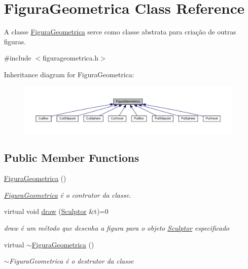 \hypertarget{class_figura_geometrica}{}\section{Figura\+Geometrica Class Reference}
\label{class_figura_geometrica}


A classe \hyperlink{class_figura_geometrica}{Figura\+Geometrica} serce como classe abstrata para criação de outras figuras.  




{\ttfamily \#include $<$figurageometrica.\+h$>$}



Inheritance diagram for Figura\+Geometrica\+:
\nopagebreak
\begin{figure}[H]
\begin{center}
\leavevmode
\includegraphics[width=350pt]{class_figura_geometrica__inherit__graph}
\end{center}
\end{figure}
\subsection*{Public Member Functions}
\begin{DoxyCompactItemize}
\item 
\hyperlink{class_figura_geometrica_a81d7c7efaea511e60a15f5a363138dd9}{Figura\+Geometrica} ()
\begin{DoxyCompactList}\small\item\em \hyperlink{class_figura_geometrica}{Figura\+Geometrica} é o contrutor da classe. \end{DoxyCompactList}\item 
virtual void \hyperlink{class_figura_geometrica_a34585fd7c0bd7378fc69c4ee208e676c}{draw} (\hyperlink{class_sculptor}{Sculptor} \&t)=0
\begin{DoxyCompactList}\small\item\em draw é um método que desenha a figura para o objeto \hyperlink{class_sculptor}{Sculptor} especificado \end{DoxyCompactList}\item 
virtual \hyperlink{class_figura_geometrica_ad13b9bccf1b14f6b9fbc662aad61ffd1}{$\sim$\+Figura\+Geometrica} ()
\begin{DoxyCompactList}\small\item\em $\sim$\+Figura\+Geometrica é o destrutor da classe \end{DoxyCompactList}\end{DoxyCompactItemize}
